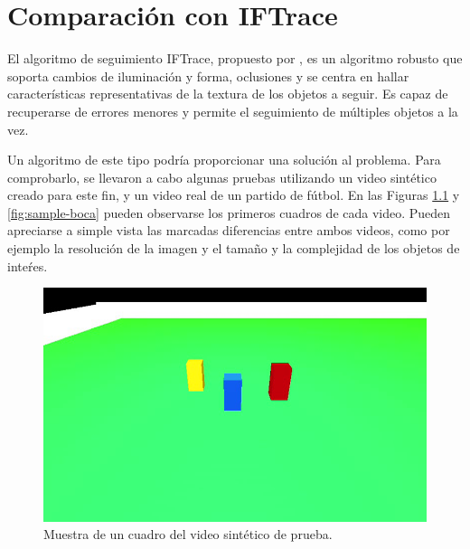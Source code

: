 \chapter{Comparación con IFTrace}
\label{sec:iftrace}

El algoritmo de seguimiento IFTrace, propuesto por \citeauthor*{IFTrace}, es un algoritmo robusto que soporta
cambios de iluminación y forma, oclusiones y se centra en hallar características representativas de la textura
de los objetos a seguir. Es capaz de recuperarse de errores menores y permite el seguimiento de múltiples objetos
a la vez.

Un algoritmo de este tipo podría proporcionar una solución al problema. Para comprobarlo, se llevaron a cabo algunas pruebas
utilizando un video sintético creado para este fin, y un video real de un partido de fútbol. En las Figuras \ref{fig:sample-happy-occluded}
y \ref{fig:sample-boca} pueden observarse los primeros cuadros de cada video. Pueden apreciarse a simple vista las marcadas diferencias
entre ambos videos, como por ejemplo la resolución de la imagen y el tamaño y la complejidad de los objetos de inteŕes.

\begin{figure}[H]
    \centering
    \includegraphics[width=\linewidth]{./images/sample_happy_occluded.png}
    \caption{Muestra de un cuadro del video sintético de prueba.}
    \label{fig:sample-happy-occluded}
\end{figure}

